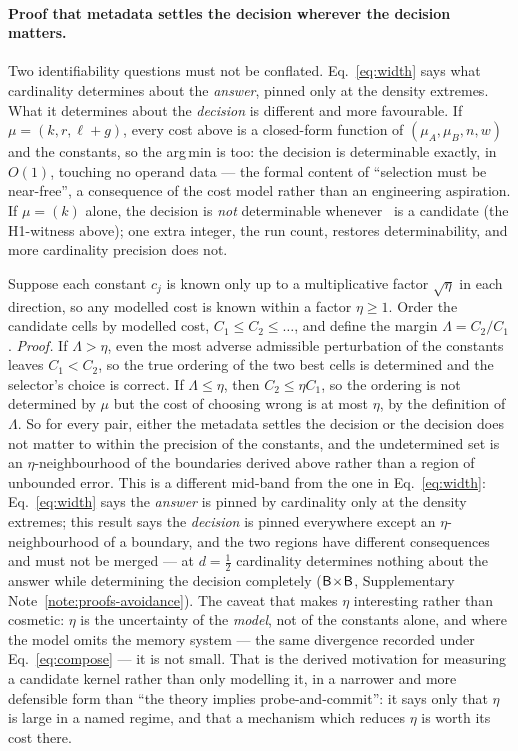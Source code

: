 \paragraph*{Proof that metadata settles the decision wherever the decision matters.}
Two identifiability questions must not be conflated. Eq.~\eqref{eq:width} says what cardinality
determines about the \emph{answer}, pinned only at the density extremes. What it determines about the
\emph{decision} is different and more favourable. If $\mu=(k,r,\ell+g)$, every cost above is a
closed-form function of $(\mu_A,\mu_B,n,w)$ and the constants, so the arg\,min is too: the decision is
determinable exactly, in $O(1)$, touching no operand data --- the formal content of ``selection must be
near-free'', a consequence of the cost model rather than an engineering aspiration. If $\mu=(k)$ alone,
the decision is \emph{not} determinable whenever \rR\ is a candidate (the H1-witness above); one extra
integer, the run count, restores determinability, and more cardinality precision does not.

Suppose each constant $c_j$ is known only up to a multiplicative factor $\sqrt\eta$ in each
direction, so any modelled cost is known within a factor $\eta\ge1$. Order the candidate cells by
modelled cost, $C_1\le C_2\le\dots$, and define the margin $\Lambda=C_2/C_1$. \emph{Proof.} If
$\Lambda>\eta$, even the most adverse admissible perturbation of the constants leaves $C_1<C_2$, so
the true ordering of the two best cells is determined and the selector's choice is correct. If
$\Lambda\le\eta$, then $C_2\le\eta C_1$, so the ordering is not determined by $\mu$ but the cost of
choosing wrong is at most $\eta$, by the definition of $\Lambda$. So for every pair, either
the metadata settles the decision or the decision does not matter to within the precision of the
constants, and the undetermined set is an $\eta$-neighbourhood of the boundaries derived above rather
than a region of unbounded error. This is a different mid-band from the one in Eq.~\eqref{eq:width}:
Eq.~\eqref{eq:width} says the \emph{answer} is pinned by cardinality only at the density extremes;
this result says the \emph{decision} is pinned everywhere except an $\eta$-neighbourhood of a
boundary, and the two regions have different consequences and must not be merged --- at $d=\tfrac12$
cardinality determines nothing about the answer while determining the decision completely
($\textsf{B}\!\times\!\textsf{B}$, Supplementary Note~\ref{note:proofs-avoidance}). The caveat that makes $\eta$ interesting rather than
cosmetic: $\eta$ is the uncertainty of the \emph{model}, not of the constants alone, and where the
model omits the memory system --- the same divergence recorded under Eq.~\eqref{eq:compose} --- it is
not small. That is the derived motivation for measuring a candidate kernel rather than only modelling
it, in a narrower and more defensible form than ``the theory implies probe-and-commit'': it says only
that $\eta$ is large in a named regime, and that a mechanism which reduces $\eta$ is worth its cost
there.

